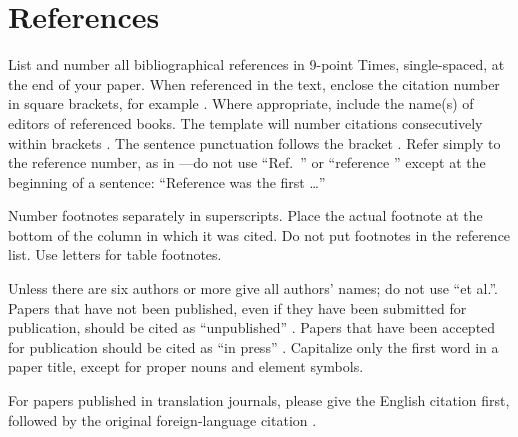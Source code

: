 \documentclass[conference,flushend]{iaria-lite}
\begin{document}
\section*{References}
List and number all bibliographical references in 9-point Times, single-spaced, at the end of your paper. When referenced in the text, enclose the citation number in square brackets, for example \cite{eason1955certain}. Where appropriate, include the name(s) of editors of referenced books. The template will number citations consecutively within brackets \cite{eason1955certain}. The sentence punctuation follows the bracket \cite{maxwell1873treatise}. Refer simply to the reference number, as in \cite{jacobs1963fine}—do not use “Ref.\ \cite{jacobs1963fine}” or “reference \cite{jacobs1963fine}” except at the beginning of a sentence: “Reference \cite{jacobs1963fine} was the first \ldots”

Number footnotes separately in superscripts. Place the actual footnote at the bottom of the column in which it was cited. Do not put footnotes in the reference list. Use letters for table footnotes.

Unless there are six authors or more give all authors’ names; do not use “et al.”. Papers that have not been published, even if they have been submitted for publication, should be cited as “unpublished” \cite{four}. Papers that have been accepted for publication should be cited as “in press” \cite{five}. Capitalize only the first word in a paper title, except for proper nouns and element symbols.

For papers published in translation journals, please give the English citation first, followed by the original foreign-language citation \cite{yorozu1987electron}.

\nocite{kornack2001cell}
\nocite{kito2013emergent}
\nocite{goto2007efficient}


\vfill %
\begingroup
\sloppy
\printbibliography
\endgroup 
\end{document}
